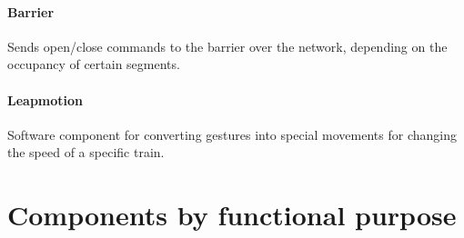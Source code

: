 \paragraph{Barrier} 
Sends open/close commands to the barrier over the network, depending on the occupancy of certain segments.
\paragraph{Leapmotion}
Software component for converting gestures into special movements for changing the speed of a specific train.

\section{Components by functional purpose}
